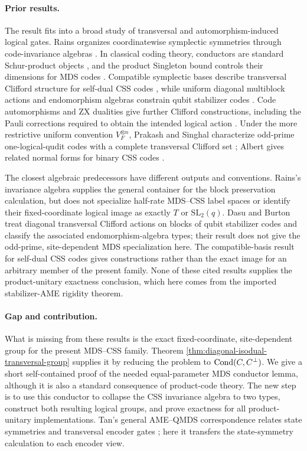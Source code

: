\paragraph{Prior results.}
The result fits into a broad study of transversal and automorphism-induced
logical gates.  Rains organizes coordinatewise symplectic symmetries through
code-invariance algebras \cite[Theorems~4 and~14]{RainsNonbinary1999}.
In classical coding theory, conductors are standard Schur-product objects
\cite[Section~2]{CouvreurMarquezCorbellaPellikaan2017}, and the product
Singleton bound controls their dimensions for MDS codes
\cite{MirandolaZemor2015}.
Compatible symplectic bases describe transversal Clifford structure for
self-dual CSS codes \cite[Theorem~1]{TansuwannontTakadaFujii2025}, while
uniform diagonal multiblock actions and endomorphism algebras constrain qubit
stabilizer codes \cite[Section~II and Theorem~6.1]{DasuBurton2025}.
Code automorphisms and ZX dualities give further Clifford constructions,
including the Pauli corrections required to obtain the intended logical
action \cite[Sections~III--IV]{SayginelEtAl2025}.  Under the more restrictive
uniform convention \(V_F^{\otimes n}\), Prakash and Singhal characterize
odd-prime one-logical-qudit codes with a complete transversal Clifford set
\cite[Section~IV.C]{PrakashSinghal2026}; Albert gives related normal forms for
binary CSS codes \cite[Sections~III--V]{Albert2026}.

The closest algebraic predecessors have different outputs and conventions.
Rains's invariance algebra supplies the general container for the block
preservation calculation, but does not specialize half-rate MDS--CSS label
spaces or identify their fixed-coordinate logical image as exactly \(T\) or
\(\mathrm{SL}_2(q)\).  Dasu and Burton treat diagonal transversal Clifford
actions on blocks of qubit stabilizer codes and classify the associated
endomorphism-algebra types; their result does not give the odd-prime,
site-dependent MDS specialization here.  The compatible-basis result for
self-dual CSS codes gives constructions rather than the exact image for an
arbitrary member of the present family.  None of these cited results supplies
the product-unitary exactness conclusion, which here comes from the imported
stabilizer-AME rigidity theorem.

\paragraph{Gap and contribution.}
What is missing from these results is the exact fixed-coordinate,
site-dependent group for the present MDS--CSS family.  Theorem
\ref{thm:diagonal-isodual-transversal-group} supplies it by reducing the
problem to \(\operatorname{Cond}(C,C^\perp)\).  We give a short self-contained proof of the
needed equal-parameter MDS conductor lemma, although it is also a standard
consequence of product-code theory.  The new step is to use this conductor to
collapse the CSS invariance algebra to two types, construct both resulting
logical groups, and prove exactness for all product-unitary implementations.
Tan's general AME--QMDS correspondence
relates state symmetries and transversal encoder gates
\cite[Theorems~3.5--3.6]{Tan2026}; here it transfers the state-symmetry
calculation to each encoder view.

